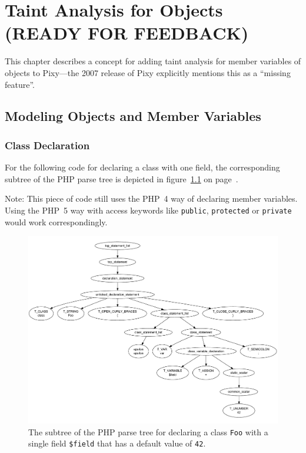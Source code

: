 \chapter{Taint Analysis for Objects (READY FOR FEEDBACK)}
\label{field-tainting}

This chapter describes a concept for adding taint analysis for member variables of objects to Pixy---the 2007 release of Pixy explicitly mentions this as a ``missing feature''.


\section{Modeling Objects and Member Variables}


\subsection{Class Declaration}

For the following code for declaring a class with one field, the corresponding subtree of the PHP parse tree is depicted in figure~\ref{fig:parse-tree-foo-class} on page~\pageref{fig:parse-tree-foo-class}.


Note: This piece of code still uses the PHP~4 way of declaring member variables. Using the PHP~5 way with access keywords like \texttt{public}, \texttt{protected} or \texttt{private} would work correspondingly.

\begin{figure}[htb]
  \begin{center}
    \includegraphics[scale=0.5]{images/parsetree-foo-class-declaration}
   \caption{The subtree of the PHP parse tree for declaring a class \texttt{Foo} with a single field \texttt{\$field} that has a default value of \texttt{42}.}
   \label{fig:parse-tree-foo-class}
  \end{center}
\end{figure}

